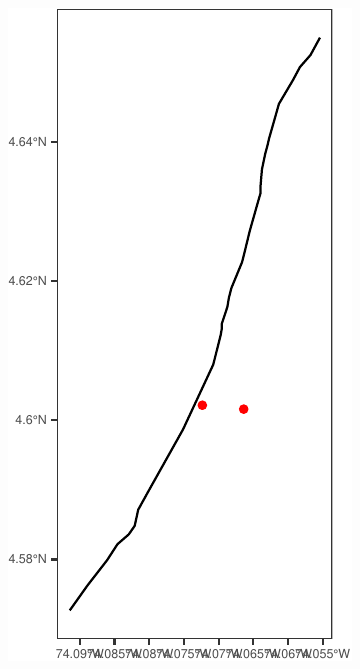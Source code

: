 \documentclass[
  shownotes,
  xcolor={svgnames},
  hyperref={colorlinks,citecolor=DarkBlue,linkcolor=DarkRed,urlcolor=DarkBlue}
   , aspectratio=169]{beamer}
\begin{document}
\begin{frame}[fragile]
\begin{minipage}[t]{0.43\linewidth}
\begin{figure}[H]
\includegraphics[scale=0.6]{figures/unnamed-chunk-7-1.pdf}

    \end{figure}
    \end{minipage}

\end{frame}

\end{document}
